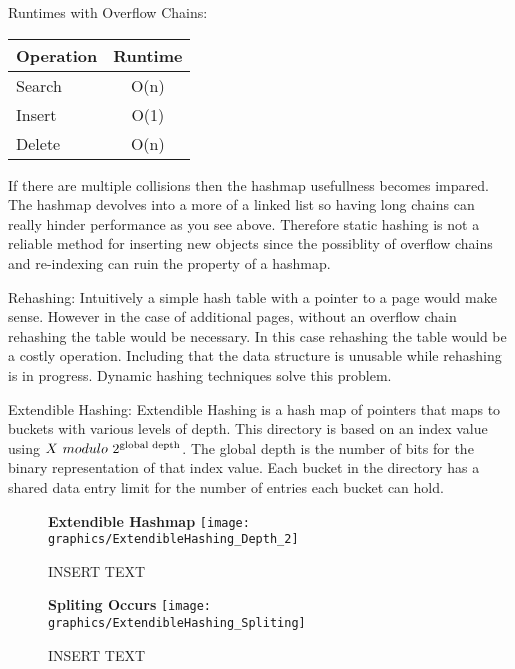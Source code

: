 \documentclass[letterpaper, 12pt]{article}
\begin{document}
Runtimes with Overflow Chains:
\par\vspace{\baselineskip}
\begin{center}
\begin{tabular}{l | c}
  \hline
  Operation & Runtime \\ \hline \hline
  Search & O(n) \\ \hline
  Insert & O(1) \\ \hline
  Delete & O(n) \\ \hline
\end{tabular}
\end{center}

If there are multiple collisions then the hashmap usefullness becomes impared. The hashmap devolves into a more
of a linked list so having long chains can really hinder performance as you see above. Therefore static hashing
is not a reliable method for inserting new objects since the possiblity of overflow chains and re-indexing can
ruin the property of a hashmap.
\par\vspace{\baselineskip}

Rehashing:
Intuitively a simple hash table with a pointer to a page would make sense. However in the case of 
additional pages, without an overflow chain rehashing the table would be necessary. In this 
case rehashing the table would be a costly operation. Including that the data structure is unusable 
while rehashing is in progress. Dynamic hashing techniques solve this problem.
\par\vspace{\baselineskip}

Extendible Hashing:
Extendible Hashing is a hash map of pointers that maps to buckets with various levels of depth. This directory 
is based on an index value using $ X\ modulo\ 2\textsuperscript{global depth} $. The global depth is the number of bits for the binary
representation of that index value. Each bucket in the directory has a shared data entry limit for the number of 
entries each bucket can hold.

\begin{figure}
  \centering
  \textbf{Extendible Hashmap}
  \texttt{[image: graphics/ExtendibleHashing\_Depth\_2]}
  \caption{INSERT TEXT}
\end{figure}

\begin{figure}
  \centering
  \textbf{Spliting Occurs}
  \texttt{[image: graphics/ExtendibleHashing\_Spliting]}
  \caption{INSERT TEXT}
\end{figure}
\end{document}
